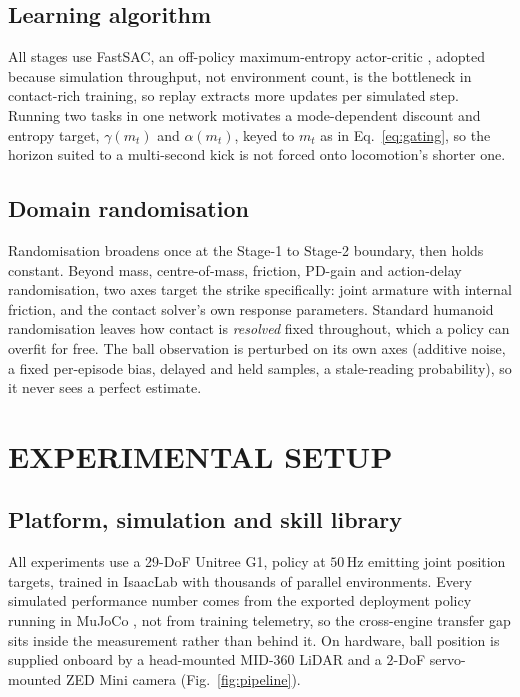 \documentclass[letterpaper, 10 pt, conference]{ieeeconf}  %
\begin{document}
\subsection{Learning algorithm}

All stages use FastSAC, an off-policy maximum-entropy actor-critic
\cite{sac,fastsac}, adopted because simulation throughput, not environment
count, is the bottleneck in contact-rich training, so replay extracts more
updates per simulated step. Running two tasks in one network motivates a
mode-dependent discount and entropy target, $\gamma(m_t)$ and $\alpha(m_t)$,
keyed to $m_t$ as in Eq.~\ref{eq:gating}, so the horizon suited to a
multi-second kick is not forced onto locomotion's shorter one.

\subsection{Domain randomisation}

Randomisation broadens once at the Stage-1 to Stage-2 boundary, then holds
constant. Beyond mass, centre-of-mass, friction, PD-gain and action-delay
randomisation, two axes target the strike specifically: joint armature with
internal friction, and the contact solver's own response parameters. Standard
humanoid randomisation leaves how contact is \emph{resolved} fixed throughout,
which a policy can overfit for free. The ball observation is perturbed on its
own axes (additive noise, a fixed per-episode bias, delayed and held
samples, a stale-reading probability), so it never sees a perfect estimate.


\section{EXPERIMENTAL SETUP}
\label{sec:setup}

\subsection{Platform, simulation and skill library}

All experiments use a 29-DoF Unitree G1, policy at $50$\,Hz emitting joint
position targets, trained in IsaacLab \cite{isaaclab} with thousands of parallel
environments. Every simulated performance number comes from the exported
deployment policy running in MuJoCo \cite{mujoco}, not from training telemetry,
so the cross-engine transfer gap sits inside the measurement rather than behind
it. On hardware, ball position is supplied onboard by a head-mounted MID-360
LiDAR and a $2$-DoF servo-mounted ZED Mini camera
(Fig.~\ref{fig:pipeline}).
\end{document}
